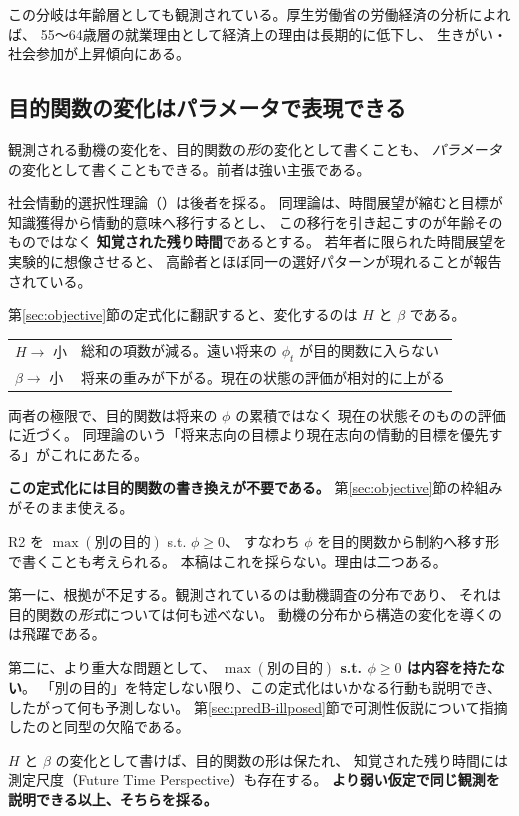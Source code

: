 この分岐は年齢層としても観測されている。厚生労働省の労働経済の分析によれば、
55〜64歳層の就業理由として経済上の理由は長期的に低下し、
生きがい・社会参加が上昇傾向にある。

\subsection{目的関数の変化はパラメータで表現できる}
\label{sec:r2-sst}

観測される動機の変化を、目的関数の\emph{形}の変化として書くことも、
\emph{パラメータ}の変化として書くこともできる。前者は強い主張である。

社会情動的選択性理論（\cite{carstensen1999}）は後者を採る。
同理論は、時間展望が縮むと目標が知識獲得から情動的意味へ移行するとし、
この移行を引き起こすのが年齢そのものではなく
\textbf{知覚された残り時間}であるとする。
若年者に限られた時間展望を実験的に想像させると、
高齢者とほぼ同一の選好パターンが現れることが報告されている。

第\ref{sec:objective}節の定式化に翻訳すると、変化するのは $H$ と $\beta$ である。

\begin{center}
\begin{tabularx}{\textwidth}{@{}lX@{}}
\toprule
$H \to$ 小 & 総和の項数が減る。遠い将来の $\phi_t$ が目的関数に入らない \\
$\beta \to$ 小 & 将来の重みが下がる。現在の状態の評価が相対的に上がる \\
\bottomrule
\end{tabularx}
\label{tab:solo-h-beta}
\end{center}

両者の極限で、目的関数は将来の $\phi$ の累積ではなく
現在の状態そのものの評価に近づく。
同理論のいう「将来志向の目標より現在志向の情動的目標を優先する」がこれにあたる。

\textbf{この定式化には目的関数の書き換えが不要である。}
第\ref{sec:objective}節の枠組みがそのまま使える。

\begin{remark}[目的関数の形を変える定式化を採らない理由]
\label{rem:phi-demotion-retracted}
R2 を $\max(\text{別の目的})$ s.t. $\phi\geq 0$、
すなわち $\phi$ を目的関数から制約へ移す形で書くことも考えられる。
本稿はこれを採らない。理由は二つある。

第一に、根拠が不足する。観測されているのは動機調査の分布であり、
それは目的関数の\emph{形式}については何も述べない。
動機の分布から構造の変化を導くのは飛躍である。

第二に、より重大な問題として、
\textbf{$\max(\text{別の目的})$ s.t. $\phi\geq 0$ は内容を持たない}。
「別の目的」を特定しない限り、この定式化はいかなる行動も説明でき、
したがって何も予測しない。
第\ref{sec:predB-illposed}節で可測性仮説について指摘したのと同型の欠陥である。

$H$ と $\beta$ の変化として書けば、目的関数の形は保たれ、
知覚された残り時間には測定尺度（Future Time Perspective）も存在する。
\textbf{より弱い仮定で同じ観測を説明できる以上、そちらを採る。}
\end{remark}

